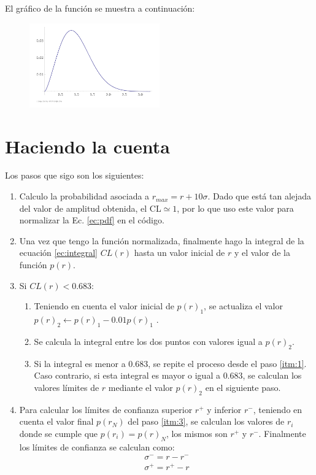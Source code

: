 El gráfico de la función se muestra a continuación:

\begin{figure}[H]
    \begin{small}
        \begin{center}
            \includegraphics[width=0.5\textwidth]{bessel.png}
        \end{center}
        \caption{}
    \end{small}
\end{figure}


\section{Haciendo la cuenta}

Los pasos que sigo son los siguientes: 

\begin{enumerate}
    \item Calculo la probabilidad asociada a $r_{max}=r +  10\sigma$. Dado que está tan alejada del valor de amplitud obtenida, el CL$\simeq 1$, por lo que uso este valor para normalizar  la Ec. \ref{ec:pdf} en el código.
    \item Una vez que tengo la función normalizada, finalmente hago la integral de la ecuación \ref{ec:integral} $CL(r)$ hasta un valor inicial de $r$ y el valor de la función $p(r)$.
    \item Si $CL(r)< 0.683$:
    \begin{enumerate}
        \item Teniendo en cuenta el valor inicial de $p(r)_1$, se actualiza el valor  $p(r)_2 \leftarrow p(r)_1 - 0.01 p(r)_1$ \label{itm:1}.
        \item Se calcula la integral entre los dos puntos con valores igual a $p(r)_2$. 
        \item Si la integral es menor a $0.683$, se repite el proceso desde el paso \ref{itm:1}. Caso contrario, si esta integral es mayor o igual a $0.683$, se calculan los valores límites de $r$ mediante el valor $p(r)_2$ en el siguiente paso. \label{itm:3}
    \end{enumerate}
    \item Para calcular los límites de confianza superior $r^+$  y inferior $r^-$, teniendo en cuenta el valor final $p(r_N)$ del paso \ref{itm:3}, se calculan los valores de $r_i$ donde se cumple que $p(r_i)=p(r)_N$, los mismos son $r^+$  y  $r^-$. Finalmente los límites de confianza se calculan como:
    \begin{align*}
        \sigma^- = r-r^-\\
        \sigma^+ = r^+ -r
    \end{align*}
\end{enumerate}


